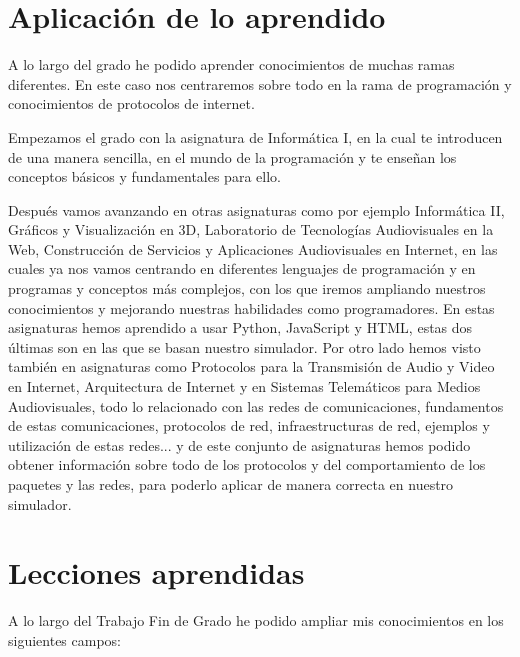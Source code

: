 \documentclass[a4paper, 12pt]{book}
\begin{document}
\section{Aplicación de lo aprendido}
\label{sec:aplicacion}

A lo largo del grado he podido aprender conocimientos de muchas ramas diferentes. En este caso nos centraremos sobre todo en la rama de programación y conocimientos de protocolos de internet.

Empezamos el grado con la asignatura de Informática I, en la cual te introducen de una manera sencilla, en el mundo de la programación y te enseñan los conceptos básicos y fundamentales para ello.

Después vamos avanzando en otras asignaturas como por ejemplo Informática II, Gráficos y Visualización en 3D, Laboratorio de Tecnologías Audiovisuales en la Web, Construcción de Servicios y Aplicaciones Audiovisuales en Internet, en las cuales ya nos vamos centrando en diferentes lenguajes de programación y en programas y conceptos más complejos, con los que iremos ampliando nuestros conocimientos y mejorando nuestras habilidades como programadores. En estas asignaturas hemos aprendido a usar Python, JavaScript y HTML, estas dos últimas son en las que se basan nuestro simulador.
\newpage
Por otro lado hemos visto también en asignaturas como Protocolos para la Transmisión de Audio y Video en Internet, Arquitectura de Internet y en Sistemas Telemáticos para Medios Audiovisuales, todo lo relacionado con las redes de comunicaciones, fundamentos de estas comunicaciones, protocolos de red, infraestructuras de red, ejemplos y utilización de estas redes... y de este conjunto de asignaturas hemos podido obtener información sobre todo de los protocolos y del comportamiento de los paquetes y las redes, para poderlo aplicar de manera correcta en nuestro simulador.


\section{Lecciones aprendidas}
\label{sec:lecciones_aprendidas}

A lo largo del Trabajo Fin de Grado he podido ampliar mis conocimientos en los siguientes campos:
\end{document}
